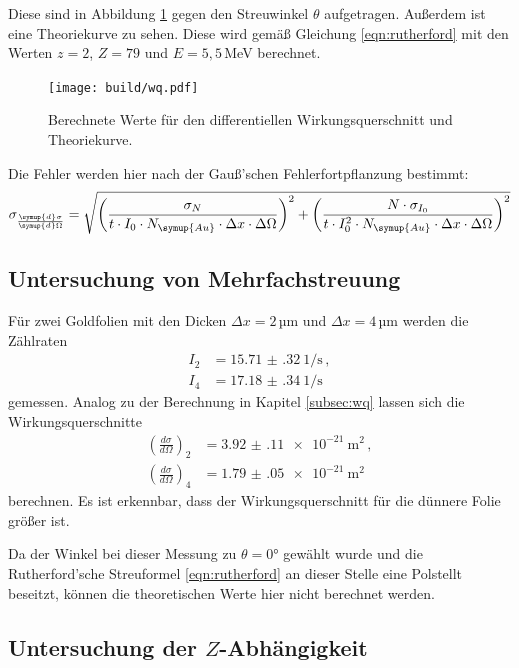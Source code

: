Diese sind in Abbildung \ref{fig:wq} gegen den Streuwinkel $\theta$ aufgetragen. Außerdem ist
eine Theoriekurve zu sehen. Diese wird gemäß Gleichung \eqref{eqn:rutherford} mit den
Werten $z=2$, $Z=79$ und $E=5{,}5$\,MeV \cite{energie} berechnet.

\begin{figure}
  \centering
  \texttt{[image: build/wq.pdf]}
  \caption{Berechnete Werte für den differentiellen Wirkungsquerschnitt und Theoriekurve.}
  \label{fig:wq}
\end{figure}

Die Fehler werden hier nach der Gauß'schen Fehlerfortpflanzung bestimmt:
\begin{equation*}
  \sigma_{\frac{\symup{d}\sigma}{\symup{d}\Omega}} = \sqrt{\left(\frac{\sigma_N}{t \cdot I_0 \cdot N_\symup{Au} \cdot \Delta x \cdot \Delta \Omega}\right)^2
  + \left(\frac{N \cdot \sigma_{I_0}}{t \cdot I_0^2 \cdot N_\symup{Au} \cdot \Delta x \cdot \Delta \Omega}\right)^2}
\end{equation*}


\subsection{Untersuchung von Mehrfachstreuung}
\label{subsec:mehrfach}

Für zwei Goldfolien mit den Dicken $\Delta x=2$\,µm und $\Delta x=4$\,µm werden
die Zählraten
\begin{align*}
  I_2&= \SI{15.71(32)}{1\per\second}\,,\\
  I_4&= \SI{17.18(34)}{1\per\second}
\end{align*}
gemessen. Analog zu der Berechnung in Kapitel \ref{subsec:wq} lassen sich die Wirkungsquerschnitte
\begin{align*}
  \left(\frac{d \sigma}{d \Omega}\right)_2&=\SI{3.92(11)e-21}{\metre\squared} \,, \\
  \left(\frac{d \sigma}{d \Omega}\right)_4&=\SI{1.79(05)e-21}{\metre\squared}
\end{align*}
berechnen. Es ist erkennbar, dass der Wirkungsquerschnitt für die dünnere Folie
größer ist.

Da der Winkel bei dieser Messung zu $\theta=0°$ gewählt wurde und die
Rutherford'sche Streuformel \eqref{eqn:rutherford} an dieser Stelle eine Polstellt beseitzt,
können die theoretischen Werte hier nicht berechnet werden.

\subsection{Untersuchung der $Z$-Abhängigkeit}
\label{subsec:z}

